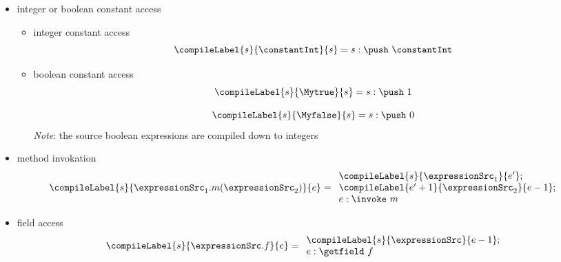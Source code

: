 

\begin{itemize}
  \item  integer or boolean constant access 
     \begin{itemize}
            \item  integer constant access 
	         $$\compileLabel{s}{\constantInt}{s}  =   s : \push \  \constantInt $$
	    \item boolean constant access
	          $$\compileLabel{s}{\Mytrue}{s} = s: \push  \ 1 $$
                   
                  $$\compileLabel{s}{\Myfalse}{s} = s: \push \ 0 $$
		  \textit{Note}: the source boolean expressions are compiled down to integers 
     \end{itemize}
  \item  method invokation
     $$\compileLabel{s}{ \expressionSrc_1.m(\expressionSrc_2)}{e} = 
           \begin{array}{l}  
                 \compileLabel{s}{\expressionSrc_1}{e'};\\
		 \compileLabel{e' + 1}{\expressionSrc_2}{e - 1};\\
		  e  :\invoke \ m
            \end{array}     
    $$
  




\item field access
     $$\compileLabel{s}{ \expressionSrc.f}{e} =   
         \begin{array}{l}
              \compileLabel{s}{\expressionSrc}{e - 1}; \\ 
              e : \getfield  \ f
           \end{array}   
     $$ 




\end{itemize}
